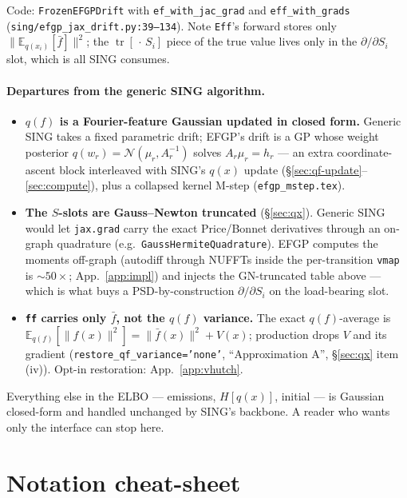 \documentclass[11pt]{article}
\newcommand{\Eq}[1][q]{\mathbb{E}_{#1}}
\newcommand{\Eqx}{\mathbb{E}_{q(x_i)}}
\newcommand{\tr}{\operatorname{tr}}
\newcommand{\code}[1]{\texttt{\small #1}}
\begin{document}
\noindent
Code: \code{FrozenEFGPDrift} with \code{ef\_with\_jac\_grad} and
\code{eff\_with\_grads} (\code{sing/efgp\_jax\_drift.py:39--134}).
Note \code{Eff}'s forward stores only $\|\Eqx[\bar f]\|^2$; the
$\tr[\,\cdot\,S_i]$ piece of the true value lives only in the
$\partial/\partial S_i$ slot, which is all SING consumes.

\paragraph{Departures from the generic SING algorithm.}
\begin{itemize}\setlength\itemsep{3pt}
\item[\textbf{D1}] \textbf{$q(f)$ is a Fourier-feature Gaussian updated in
closed form.} Generic SING takes a fixed parametric drift; EFGP's drift
is a GP whose weight posterior $q(w_r)=\mathcal{N}(\mu_r, A_r^{-1})$
solves $A_r\mu_r=h_r$ --- an extra coordinate-ascent block interleaved
with SING's $q(x)$ update (\S\ref{sec:qf-update}--\ref{sec:compute}), plus
a collapsed kernel M-step (\texttt{efgp\_mstep.tex}).
\item[\textbf{D2}] \textbf{The $S$-slots are Gauss--Newton truncated}
(\S\ref{sec:qx}). Generic SING would let \code{jax.grad} carry the exact
Price/Bonnet derivatives through an on-graph quadrature (e.g.\
\code{GaussHermiteQuadrature}). EFGP computes the moments off-graph
(autodiff through NUFFTs inside the per-transition \code{vmap} is
${\sim}50\times$; App.~\ref{app:impl}) and injects the GN-truncated table
above --- which is what buys a PSD-by-construction $\partial/\partial S_i$
on the load-bearing slot.
\item[\textbf{D3}] \textbf{\code{ff} carries only $\bar f$, not the $q(f)$
variance.} The exact $q(f)$-average is
$\Eq[q(f)][\|f(x)\|^2]=\|\bar f(x)\|^2 + V(x)$; production drops $V$ and
its gradient (\code{restore\_qf\_variance='none'}, ``Approximation A'',
\S\ref{sec:qx} item (iv)). Opt-in restoration: App.~\ref{app:vhutch}.
\end{itemize}
Everything else in the ELBO --- emissions, $H[q(x)]$, initial --- is
Gaussian closed-form and handled unchanged by SING's backbone. A reader
who wants only the interface can stop here.

\section{Notation cheat-sheet}
\label{sec:notation}
\end{document}
